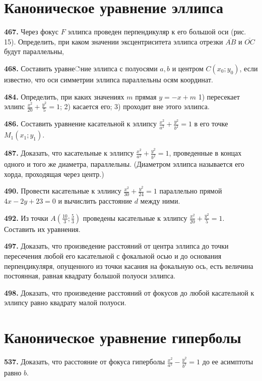 \section{Каноническое уравнение эллипса}



\textbf{467.} Через фокус $F$ эллипса проведен перпендикуляр к его большой оси (рис. 15). Определить, при каком значении эксцентриситета эллипса отрезки $\overline{A B}$ и $\overline{O C}$ будут параллельны,

\textbf{468.} Составить уравне்ние эллипса с полуосями $a, b$ и центром $C\left(x_0 ; y_0\right)$, если известно, что оси симметрии эллипса параллельны осям координат.

\textbf{484.} Определить, при каких значениях $m$ прямая $y=-x+m$ 1) пересекает эллипс $\frac{x^2}{20}+\frac{y^2}{5}=1$; 2) касается его; 3) проходит вне этого эллипса.

\textbf{486.} Составить уравнение касательной к эллипсу $\frac{x^2}{a^2}+\frac{y^2}{b^2}=1$ в его точке $M_1\left(x_1 ; y_1\right)$.

\textbf{487.} Доказать, что касательные к эллипсу $\frac{x^2}{a^2}+\frac{y^2}{b^2}=1$, проведенные в концах одного и того же диаметра, параллельны. (Диаметром эллипса называется его хорда, проходящая через центр.)

\textbf{490.} Провести касательные к эллиису $\frac{x^2}{30}+\frac{y^2}{24}=1$ параллельно прямой $4 x-2 y+23=0$ и вычислить расстояние $d$ между ними.

\textbf{492.} Из точки $A\left(\frac{10}{3} ; \frac{5}{3}\right)$ проведены касательные к эллипсу $\frac{x^2}{20}+\frac{y^2}{5}=1$. Составить их уравнения.

\textbf{497.} Доказать, что произведение расстояний от центра эллипса до точки пересечения любой его касательной с фокальной осью и до основания перпендикуляря, опущенного из точки касания на фокальную ось, есть величина постоянная, равная квадрату большой полуоси эллипса.

\textbf{498.} Доказать, что произведение расстояний от фокусов до любой касательной к эллипсу равно квадрату малой полуоси.



\section{Каноническое уравнение гиперболы}



\textbf{537.} Доказать, что расстояние от фокуса гиперболы $\frac{x^2}{a^2}-\frac{y^2}{b^2}=1$ до ее асимптоты равно $b$.


